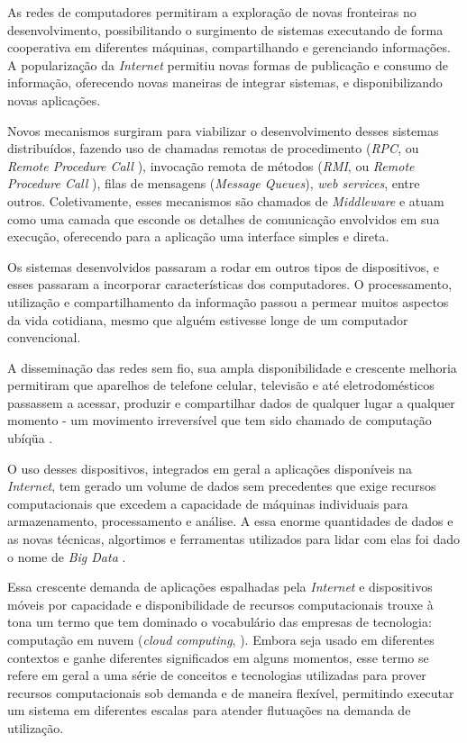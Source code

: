 \documentclass[11pt,twoside,a4paper]{book}
\begin{document}
As redes de computadores permitiram a exploração de novas fronteiras no desenvolvimento, possibilitando o surgimento de sistemas executando de forma cooperativa em diferentes máquinas, compartilhando e gerenciando informações. A popularização da \emph{Internet} permitiu novas formas de publicação e consumo de informação, oferecendo novas maneiras de integrar sistemas, e disponibilizando novas aplicações. 

Novos mecanismos surgiram para viabilizar o desenvolvimento desses sistemas distribuídos, fazendo uso de chamadas remotas de procedimento (\emph{RPC}, ou \emph{Remote Procedure Call} \cite{rpc}), invocação remota de métodos (\emph{RMI}, ou \emph{Remote Procedure Call} \cite{rmi}), filas de mensagens (\emph{Message Queues}), \emph{web services}, entre outros. Coletivamente, esses mecanismos são chamados de \emph{Middleware} \cite{alonso} e atuam como uma camada que esconde os detalhes de comunicação envolvidos em sua execução, oferecendo para a aplicação uma interface simples e direta.

Os sistemas desenvolvidos passaram a rodar em outros tipos de dispositivos, e esses passaram a incorporar características dos computadores. O processamento, utilização e compartilhamento da informação passou a permear muitos aspectos da vida cotidiana, mesmo que alguém estivesse longe de um computador convencional. 

A disseminação das redes sem fio, sua ampla disponibilidade e crescente melhoria permitiram que aparelhos de telefone celular, televisão e até eletrodomésticos passassem a acessar, produzir e compartilhar dados de qualquer lugar a qualquer momento - um movimento irreversível que tem sido chamado de computação ubíqüa \cite{ubiquitous}. 

O uso desses dispositivos, integrados em geral a aplicações disponíveis na \emph{Internet}, tem gerado um volume de dados sem precedentes que exige recursos computacionais que excedem a capacidade de máquinas individuais para armazenamento, processamento e análise. A essa enorme quantidades de dados e as novas técnicas, algortimos e ferramentas utilizados para lidar com elas foi dado o nome de \emph{Big Data} \cite{big_data}.

Essa crescente demanda de aplicações espalhadas pela \emph{Internet} e dispositivos móveis por capacidade e disponibilidade de recursos computacionais trouxe à tona um termo que tem dominado o vocabulário das empresas de tecnologia: computação em nuvem (\emph{cloud computing}, \cite{cloud}). Embora seja usado em diferentes contextos e ganhe diferentes significados em alguns momentos, esse termo se refere em geral a uma série de conceitos e tecnologias utilizadas para prover recursos computacionais sob demanda e de maneira flexível, permitindo executar um sistema em diferentes escalas para atender flutuações na demanda de utilização. 
\end{document}
